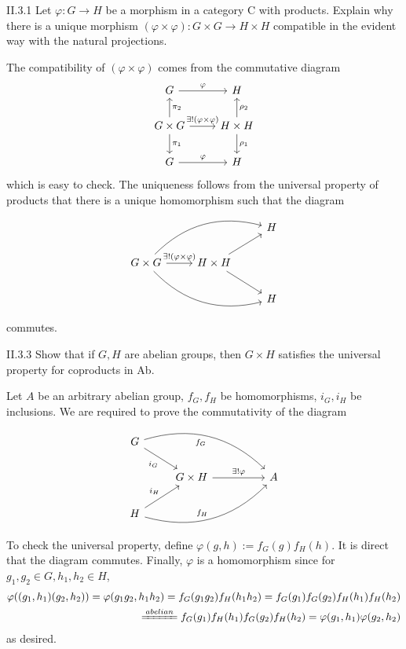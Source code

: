 \begin{problem}{II.3.1}
Let $\varphi: G \to H$ be a morphism in a category \textsf{C} with products. Explain why there is a unique morphism $(\varphi \times \varphi) : G \times G \to H \times H$ compatible in the evident way with the natural projections.  
\end{problem}
\begin{sol}
The compatibility of $(\varphi \times \varphi)$ comes from the commutative diagram
\[
\begin{tikzcd}
G \arrow[r, "\varphi"]    & H          \\
G \times G \arrow[r, "\exists!(\varphi \times \varphi)"] \arrow[d, "\pi_1"] \arrow[u, "\pi_2"'] & H \times H \arrow[d, "\rho_1"] \arrow[u, "\rho_2"'] \\
G \arrow[r, "\varphi"]  & H   
\end{tikzcd}  
\]
which is easy to check. The uniqueness follows from the universal property of products that there is a unique homomorphism such that the diagram
\[
\begin{tikzcd}
&   & H \\
G \times G \arrow[rru, bend left] \arrow[rrd, bend right] \arrow[r, "\exists ! (\varphi \times \varphi)"] & H \times H \arrow[ru] \arrow[rd] &   \\
&   & H
\end{tikzcd}
\]
commutes.
\end{sol}

\begin{problem}{II.3.3}
Show that if $G, H$ are abelian groups, then $G \times H$ satisfies the universal property for coproducts in \textsf{Ab}.
\end{problem}
\begin{pf} 
Let $A$ be an arbitrary abelian group, $f_G, f_H$ be homomorphisms, $i_G, i_H$ be inclusions. We are required to prove the commutativity of the diagram
\[
\begin{tikzcd}
G \arrow[rrrd, "f_G"', bend left] \arrow[rd, "i_G"'] &                                          &  &   \\
& G \times H \arrow[rr, "\exists!\varphi"] &  & A \\
H \arrow[rrru, "f_H", bend right] \arrow[ru, "i_H"]  &                                          &  &  
\end{tikzcd}
\]
To check the universal property, define $\varphi(g,h) := f_G(g)f_H(h)$. It is direct that the diagram commutes. Finally, $\varphi$ is a homomorphism since for $g_1,g_2 \in G, h_1,h_2 \in H$,
\[
\begin{split}
\varphi((g_1,h_1)(g_2,h_2)) = \varphi(g_1g_2,h_1h_2) = f_G(g_1g_2)f_H(h_1h_2) = f_G(g_1)f_G(g_2)f_H(h_1)f_H(h_2) \\ 
\xlongequal{abelian} f_G(g_1)f_H(h_1)f_G(g_2)f_H(h_2) = \varphi(g_1,h_1)\varphi(g_2,h_2)
\end{split}
\]
as desired.
\end{pf}


